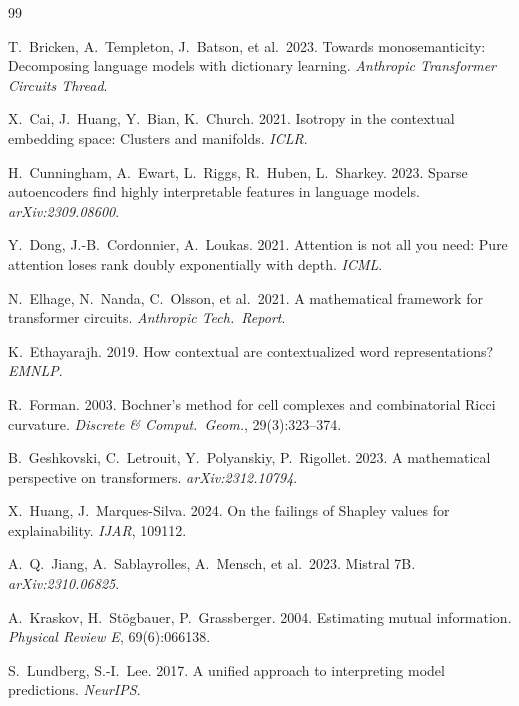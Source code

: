 \documentclass[10pt,twocolumn]{article}
\begin{document}

\begin{thebibliography}{99}

T.~Bricken, A.~Templeton, J.~Batson, et al.\ 2023. Towards monosemanticity: Decomposing language models with dictionary learning. \emph{Anthropic Transformer Circuits Thread}.

X.~Cai, J.~Huang, Y.~Bian, K.~Church. 2021. Isotropy in the contextual embedding space: Clusters and manifolds. \emph{ICLR}.

H.~Cunningham, A.~Ewart, L.~Riggs, R.~Huben, L.~Sharkey. 2023. Sparse autoencoders find highly interpretable features in language models. \emph{arXiv:2309.08600}.

Y.~Dong, J.-B.~Cordonnier, A.~Loukas. 2021. Attention is not all you need: Pure attention loses rank doubly exponentially with depth. \emph{ICML}.

N.~Elhage, N.~Nanda, C.~Olsson, et al.\ 2021. A mathematical framework for transformer circuits. \emph{Anthropic Tech.\ Report}.

K.~Ethayarajh. 2019. How contextual are contextualized word representations? \emph{EMNLP}.

R.~Forman. 2003. Bochner's method for cell complexes and combinatorial Ricci curvature. \emph{Discrete \& Comput.\ Geom.}, 29(3):323--374.

B.~Geshkovski, C.~Letrouit, Y.~Polyanskiy, P.~Rigollet. 2023. A mathematical perspective on transformers. \emph{arXiv:2312.10794}.

X.~Huang, J.~Marques-Silva. 2024. On the failings of Shapley values for explainability. \emph{IJAR}, 109112.

A.~Q.~Jiang, A.~Sablayrolles, A.~Mensch, et al.\ 2023. Mistral 7B. \emph{arXiv:2310.06825}.

A.~Kraskov, H.~St\"ogbauer, P.~Grassberger. 2004. Estimating mutual information. \emph{Physical Review E}, 69(6):066138.

S.~Lundberg, S.-I.~Lee. 2017. A unified approach to interpreting model predictions. \emph{NeurIPS}.


\end{thebibliography}
\end{document}
